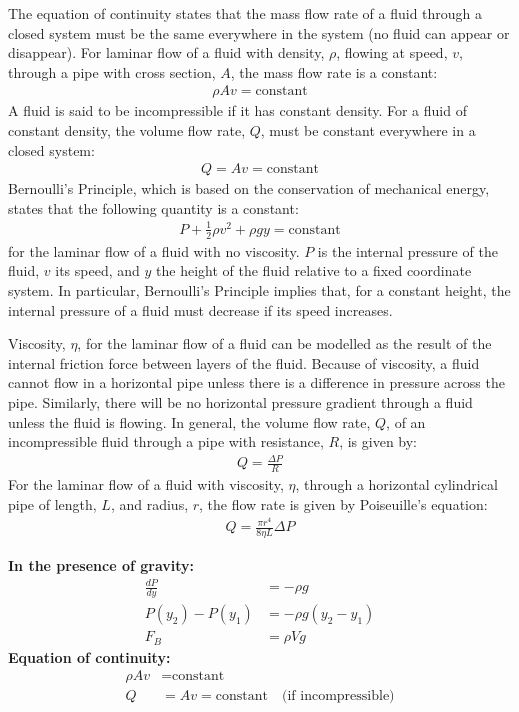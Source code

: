 {{\begin{chapterSummary}
The equation of continuity states that the mass flow rate of a fluid through a closed system must be the same everywhere in the system (no fluid can appear or disappear). For laminar flow of a fluid with density, $\rho$, flowing at speed, $v$, through a pipe with cross section, $A$, the mass flow rate is a constant:
\begin{align*}
\rho A v= \text{constant}
\end{align*}
A fluid is said to be incompressible if it has constant density. For a fluid of constant density, the volume flow rate, $Q$, must be constant everywhere in a closed system:
\begin{align*}
Q = Av = \text{constant}
\end{align*}
Bernoulli's Principle, which is based on the conservation of mechanical energy, states that the following quantity is a constant:
\begin{align*}
P + \frac{1}{2}\rho v^2 + \rho g y= \text{constant}
\end{align*}
for the laminar flow of a fluid with no viscosity. $P$ is the internal pressure of the fluid, $v$ its speed, and $y$ the height of the fluid relative to a fixed coordinate system. In particular, Bernoulli's Principle implies that, for a constant height, the internal pressure of a fluid must decrease if its speed increases.

Viscosity, $\eta$, for the laminar flow of a fluid can be modelled as the result of the internal friction force between layers of the fluid. Because of viscosity, a fluid cannot flow in a horizontal pipe unless there is a difference in pressure across the pipe. Similarly, there will be no horizontal pressure gradient through a fluid unless the fluid is flowing. In general, the volume flow rate, $Q$, of an incompressible fluid through a pipe with resistance, $R$, is given by:
\begin{align*}
Q = \frac{\Delta P}{R} 
\end{align*}
For the laminar flow of a fluid with viscosity, $\eta$, through a horizontal cylindrical pipe of length, $L$, and radius, $r$, the flow rate is given by Poiseuille's equation:
\begin{align*}
Q =  \frac{\pi r^4}{8\eta L}\Delta P
\end{align*}

\end{chapterSummary}

\newpage
\begin{importantEquations}
\begin{multicols}{2}
\textbf{In the presence of gravity:}
\begin{align*}
\frac{dP}{dy}&=-\rho g\\
P(y_2)-P(y_1)&=-\rho g(y_2-y_1)\\
F_B&=\rho Vg
\end{align*}
\textbf{Equation of continuity:}
\begin{align*}
\rho Av&=\textrm{constant}\\
Q&=Av=\textrm{constant}\quad \textrm{(if incompressible)}
\end{align*}
\columnbreak


\end{multicols}
\end{importantEquations}}}
